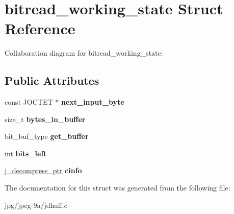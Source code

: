 \hypertarget{structbitread__working__state}{\section{bitread\+\_\+working\+\_\+state Struct Reference}
\label{structbitread__working__state}
}


Collaboration diagram for bitread\+\_\+working\+\_\+state\+:
\subsection*{Public Attributes}
\begin{DoxyCompactItemize}
\item 
\hypertarget{structbitread__working__state_a663f17ba1c850439118605f1842b2fbf}{const J\+O\+C\+T\+E\+T $\ast$ {\bfseries next\+\_\+input\+\_\+byte}}\label{structbitread__working__state_a663f17ba1c850439118605f1842b2fbf}

\item 
\hypertarget{structbitread__working__state_a9564d55e83f5b154a50a84ffb4e45809}{size\+\_\+t {\bfseries bytes\+\_\+in\+\_\+buffer}}\label{structbitread__working__state_a9564d55e83f5b154a50a84ffb4e45809}

\item 
\hypertarget{structbitread__working__state_a1b14cadab00deca48688b336c6a48664}{bit\+\_\+buf\+\_\+type {\bfseries get\+\_\+buffer}}\label{structbitread__working__state_a1b14cadab00deca48688b336c6a48664}

\item 
\hypertarget{structbitread__working__state_a3744bcf2fb8bc73560ea6e4d083cf6ff}{int {\bfseries bits\+\_\+left}}\label{structbitread__working__state_a3744bcf2fb8bc73560ea6e4d083cf6ff}

\item 
\hypertarget{structbitread__working__state_ae6ed0f717c279eac7ac54cec32cfaa3e}{\hyperlink{structjpeg__decompress__struct}{j\+\_\+decompress\+\_\+ptr} {\bfseries cinfo}}\label{structbitread__working__state_ae6ed0f717c279eac7ac54cec32cfaa3e}

\end{DoxyCompactItemize}


The documentation for this struct was generated from the following file\+:\begin{DoxyCompactItemize}
\item 
jpg/jpeg-\/9a/jdhuff.\+c\end{DoxyCompactItemize}

